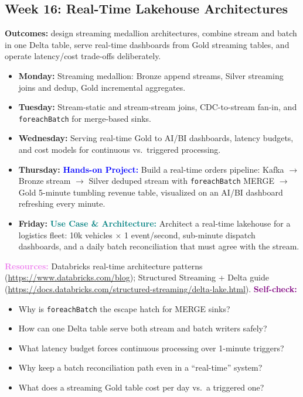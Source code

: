 \documentclass[11pt, a4paper]{article}
\newcommand{\project}[1]{\vspace{1mm}\noindent\textbf{\textcolor{blue}{Hands-on Project:}} #1}
\newcommand{\usecase}[1]{\vspace{1mm}\noindent\textbf{\textcolor{teal}{Use Case \& Architecture:}} #1}
\newcommand{\dayitem}[2]{\item \textbf{#1:} #2}
\newcommand{\resources}[1]{\vspace{1mm}\noindent\textbf{\textcolor{violet}{Resources:}} #1}
\newcommand{\selfcheck}[1]{\vspace{1mm}\noindent\textbf{\textcolor{purple}{Self-check:}} #1}
\begin{document}
\subsection*{Week 16: Real-Time Lakehouse Architectures}
\par\noindent\textbf{Outcomes:} design streaming medallion architectures, combine stream and batch in one Delta table, serve real-time dashboards from Gold streaming tables, and operate latency/cost trade-offs deliberately.
\begin{itemize}[label=-]
    \dayitem{Monday}{Streaming medallion: Bronze append streams, Silver streaming joins and dedup, Gold incremental aggregates.}
    \dayitem{Tuesday}{Stream-static and stream-stream joins, CDC-to-stream fan-in, and \texttt{foreachBatch} for merge-based sinks.}
    \dayitem{Wednesday}{Serving real-time Gold to AI/BI dashboards, latency budgets, and cost models for continuous vs.\ triggered processing.}
    \dayitem{Thursday}{\project{Build a real-time orders pipeline: Kafka $\rightarrow$ Bronze stream $\rightarrow$ Silver deduped stream with \texttt{foreachBatch} MERGE $\rightarrow$ Gold 5-minute tumbling revenue table, visualized on an AI/BI dashboard refreshing every minute.}}
    \dayitem{Friday}{\usecase{Architect a real-time lakehouse for a logistics fleet: 10k vehicles $\times$ 1 event/second, sub-minute dispatch dashboards, and a daily batch reconciliation that must agree with the stream.}}
\end{itemize}
\resources{Databricks real-time architecture patterns (\url{https://www.databricks.com/blog}); Structured Streaming + Delta guide (\url{https://docs.databricks.com/structured-streaming/delta-lake.html}).}
\selfcheck{\begin{itemize}[label=-, leftmargin=1.5em, itemsep=0pt]
    \item Why is \texttt{foreachBatch} the escape hatch for MERGE sinks?
    \item How can one Delta table serve both stream and batch writers safely?
    \item What latency budget forces continuous processing over 1-minute triggers?
    \item Why keep a batch reconciliation path even in a ``real-time'' system?
    \item What does a streaming Gold table cost per day vs.\ a triggered one?
\end{itemize}}
\end{document}
